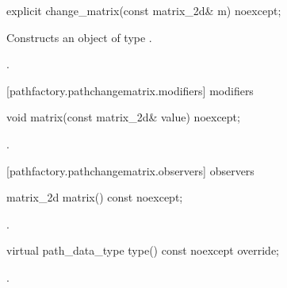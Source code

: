 \begin{itemdecl}
    explicit change_matrix(const matrix_2d& m) noexcept;
\end{itemdecl}
\begin{itemdescr}
	\pnum
	\effects
	Constructs an object of type .
	
	\pnum
	\postconditions
	.
\end{itemdescr}

 [pathfactory.pathchangematrix.modifiers]{ modifiers}

\begin{itemdecl}
    void matrix(const matrix_2d& value) noexcept;
\end{itemdecl}
\begin{itemdescr}
	\pnum
	\postconditions
	.
\end{itemdescr}

 [pathfactory.pathchangematrix.observers]{ observers}

\begin{itemdecl}
    matrix_2d matrix() const noexcept;
\end{itemdecl}
\begin{itemdescr}
	\pnum
	\returns
	.
\end{itemdescr}

\begin{itemdecl}
    virtual path_data_type type() const noexcept override;
\end{itemdecl}
\begin{itemdescr}
	\pnum
	\returns
	.
\end{itemdescr}

